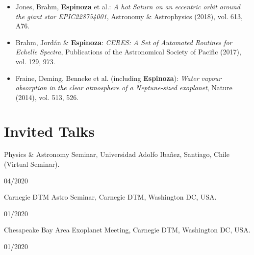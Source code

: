 \documentclass[12pt, a4paper]{article} %
\begin{document}
\begin{flushleft}
\begin{itemize}
\item Jones, Brahm, \textbf{Espinoza} et al.: \textit{A hot Saturn on an eccentric orbit around the giant star EPIC228754001},  Astronomy \& Astrophysics (2018), vol. 613, A76.
\item Brahm, Jord\'an \& \textbf{Espinoza}: \textit{CERES: A Set of Automated Routines for Echelle Spectra}, Publications of the 
Astronomical Society of Pacific (2017), vol. 129, 973.
\item Fraine, Deming, Benneke et al. (including \textbf{Espinoza}): \textit{Water vapour absorption in the clear atmosphere of a Neptune-sized exoplanet}, Nature (2014), vol. 513, 526.
\end{itemize}
\end{flushleft}



\section*{Invited Talks}
\begin{minipage}[t]{0.7\textwidth}
\begin{flushleft}%
  \setlength{\leftskip}{0.2cm}%
Physics \& Astronomy Seminar, Universidad Adolfo Iba\~nez, Santiago, Chile (Virtual Seminar).
\end{flushleft}
\end{minipage}
\begin{minipage}[t]{0.3\textwidth}
\hfill 04/2020
\end{minipage}
\vspace{0.2cm}

\begin{minipage}[t]{0.7\textwidth}
\begin{flushleft}%
  \setlength{\leftskip}{0.2cm}%
Carnegie DTM Astro Seminar, Carnegie DTM, Washington DC, USA.
\end{flushleft}
\end{minipage}
\begin{minipage}[t]{0.3\textwidth}
\hfill 01/2020
\end{minipage}
\vspace{0.2cm}

\begin{minipage}[t]{0.7\textwidth}
\begin{flushleft}%
  \setlength{\leftskip}{0.2cm}%
Chesapeake Bay Area Exoplanet Meeting, Carnegie DTM, Washington DC, USA.
\end{flushleft}
\end{minipage}
\begin{minipage}[t]{0.3\textwidth}
\hfill 01/2020
\end{minipage}
\vspace{0.2cm}
\end{document}
